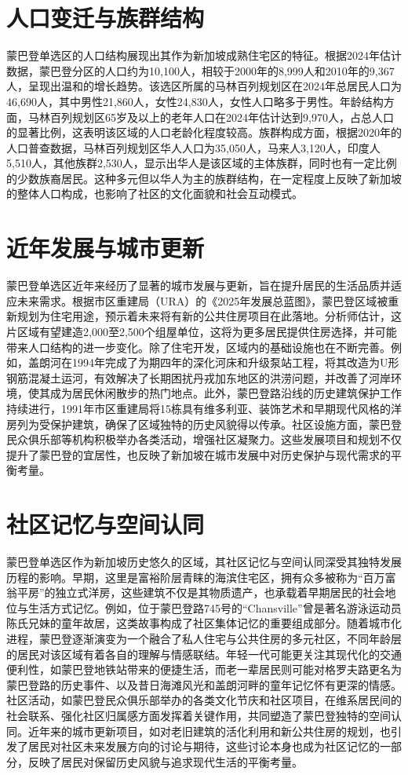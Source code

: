 \documentclass[11pt,a4paper,twoside,openany]{book}
\begin{document}
\section{人口变迁与族群结构}
蒙巴登单选区的人口结构展现出其作为新加坡成熟住宅区的特征。根据2024年估计数据，蒙巴登分区的人口约为10,100人，相较于2000年的8,999人和2010年的9,367人，呈现出温和的增长趋势。该选区所属的马林百列规划区在2024年总居民人口为46,690人，其中男性21,860人，女性24,830人，女性人口略多于男性。年龄结构方面，马林百列规划区65岁及以上的老年人口在2024年估计达到9,970人，占总人口的显著比例，这表明该区域的人口老龄化程度较高。族群构成方面，根据2020年的人口普查数据，马林百列规划区华人人口为35,050人，马来人3,120人，印度人5,510人，其他族群2,530人，显示出华人是该区域的主体族群，同时也有一定比例的少数族裔居民。这种多元但以华人为主的族群结构，在一定程度上反映了新加坡的整体人口构成，也影响了社区的文化面貌和社会互动模式。

\section{近年发展与城市更新}
蒙巴登单选区近年来经历了显著的城市发展与更新，旨在提升居民的生活品质并适应未来需求。根据市区重建局（URA）的《2025年发展总蓝图》，蒙巴登区域被重新规划为住宅用途，预示着未来将有新的公共住房项目在此落地。分析师估计，这片区域有望建造2,000至2,500个组屋单位，这将为更多居民提供住房选择，并可能带来人口结构的进一步变化。除了住宅开发，区域内的基础设施也在不断完善。例如，盖朗河在1994年完成了为期四年的深化河床和升级泵站工程，将其改造为U形钢筋混凝土运河，有效解决了长期困扰丹戎加东地区的洪涝问题，并改善了河岸环境，使其成为居民休闲散步的热门地点。此外，蒙巴登路沿线的历史建筑保护工作持续进行，1991年市区重建局将15栋具有维多利亚、装饰艺术和早期现代风格的洋房列为受保护建筑，确保了区域独特的历史风貌得以传承。社区设施方面，蒙巴登民众俱乐部等机构积极举办各类活动，增强社区凝聚力。这些发展项目和规划不仅提升了蒙巴登的宜居性，也反映了新加坡在城市发展中对历史保护与现代需求的平衡考量。

\section{社区记忆与空间认同}
蒙巴登单选区作为新加坡历史悠久的区域，其社区记忆与空间认同深受其独特发展历程的影响。早期，这里是富裕阶层青睐的海滨住宅区，拥有众多被称为“百万富翁平房”的独立式洋房，这些建筑不仅是其物质遗产，也承载着早期居民的社会地位与生活方式记忆。例如，位于蒙巴登路745号的“Chansville”曾是著名游泳运动员陈氏兄妹的童年故居，这类故事构成了社区集体记忆的重要组成部分。随着城市化进程，蒙巴登逐渐演变为一个融合了私人住宅与公共住房的多元社区，不同年龄层的居民对该区域有着各自的理解与情感联结。年轻一代可能更关注其现代化的交通便利性，如蒙巴登地铁站带来的便捷生活，而老一辈居民则可能对格罗夫路更名为蒙巴登路的历史事件、以及昔日海滩风光和盖朗河畔的童年记忆怀有更深的情感。社区活动，如蒙巴登民众俱乐部举办的各类文化节庆和社区项目，在维系居民间的社会联系、强化社区归属感方面发挥着关键作用，共同塑造了蒙巴登独特的空间认同。近年来的城市更新项目，如对老旧建筑的活化利用和新公共住房的规划，也引发了居民对社区未来发展方向的讨论与期待，这些讨论本身也成为社区记忆的一部分，反映了居民对保留历史风貌与追求现代生活的平衡考量。
\end{document}
